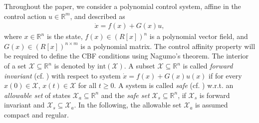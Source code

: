 \documentclass[lettersize,journal]{IEEEtran}
\newcommand{\R}{\mathbb{R}}
\newtheorem{assumption}{Assumption}
\begin{document}
Throughout the paper, we consider a polynomial control system, affine in the control action $u \in \R^m$, and described as
\begin{align} \label{eq:control_system}
   \dot x = f(x) + G(x) u,
\end{align}
where $x \in \R^n$ is the state, $f(x) \in \left( R[x] \right)^n$ is a polynomial vector field, and $G(x) \in \left( R[x] \right)^{n \times m}$ is a polynomial matrix.
The control affinity property will be required to define the CBF conditions using Nagumo's theorem.
The interior of a set $\mathcal X \subseteq \R^n$ is denoted by $\text{int}(\mathcal X)$.
A subset $\mathcal X \subseteq \R^n$ is called \emph{forward invariant} (cf. \cite[Theorem 4.4]{Khalil:02}) with respect to system $\dot x = f(x) + G(x) u(x)$ if for every $x(0) \in \mathcal X$, $x(t) \in \mathcal X$ for all $t \geq 0$.
A system is called \emph{safe} (cf. \cite{WielandAllgower:07}) w.r.t. an \emph{allowable set} of states $\mathcal X_a \subseteq \R^n$ and the \emph{safe set} $\mathcal X_s \subseteq \R^n$, if $\mathcal X_s$ is forward invariant and $\mathcal X_s \subseteq \mathcal X_a$.
In the following, the allowable set $\mathcal X_a$ is assumed compact and regular.




\end{document}
